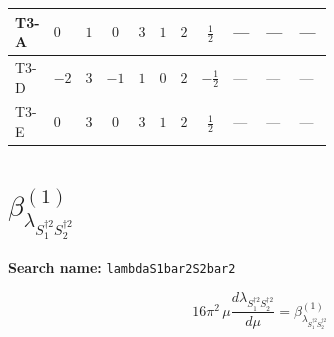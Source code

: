 \documentclass[8pt]{article}
\begin{document}
\begin{landscape}
\begin{longtable}{@{}llcccccc >{\raggedright\arraybackslash}p{0.21\linewidth} >{\raggedright\arraybackslash}p{0.21\linewidth} >{\raggedright\arraybackslash}p{0.21\linewidth}@{}}
\midrule
T3-A & $0$ & $1$ & $0$ & $3$ & $1$ & $2$ & $\frac{1}{2}$ & --- & --- & --- \\
\midrule
T3-D & $-2$ & $3$ & $-1$ & $1$ & $0$ & $2$ & $-\frac{1}{2}$ & --- & --- & --- \\
\midrule
T3-E & $0$ & $3$ & $0$ & $3$ & $1$ & $2$ & $\frac{1}{2}$ & --- & --- & --- \\
\midrule
\bottomrule
\end{longtable}
\clearpage
\section*{$\beta_{\lambda_{S_1^{\dagger 2}S_2^{\dagger 2}}}^{(1)}$}
\noindent\textbf{Search name: }\texttt{lambdaS1bar2S2bar2}\par\smallskip
\[16\pi^2\,\mu\frac{d \lambda_{S_1^{\dagger 2}S_2^{\dagger 2}}}{d\mu}=\beta_{\lambda_{S_1^{\dagger 2}S_2^{\dagger 2}}}^{(1)}\]

\end{landscape}
\end{document}
